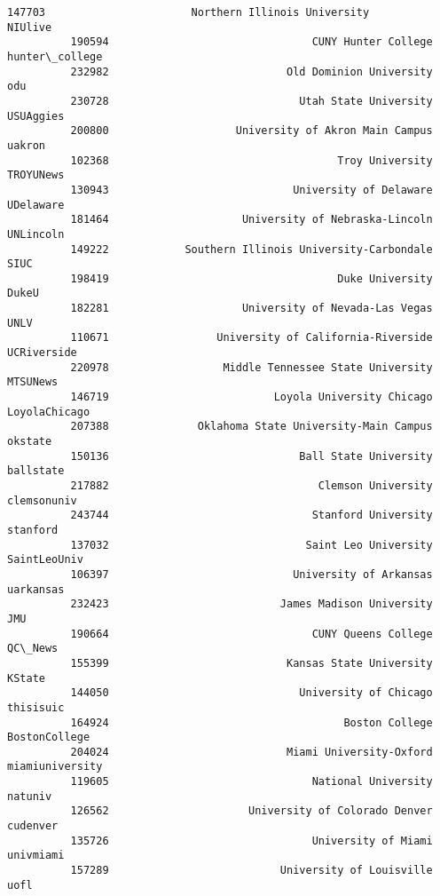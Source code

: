\documentclass[11pt]{article}
\begin{document}
\begin{Verbatim}[commandchars=\\\{\}]
          147703                       Northern Illinois University          NIUlive   
          190594                                CUNY Hunter College   hunter\_college   
          232982                            Old Dominion University              odu   
          230728                              Utah State University        USUAggies   
          200800                    University of Akron Main Campus           uakron   
          102368                                    Troy University        TROYUNews   
          130943                             University of Delaware        UDelaware   
          181464                     University of Nebraska-Lincoln        UNLincoln   
          149222            Southern Illinois University-Carbondale             SIUC   
          198419                                    Duke University            DukeU   
          182281                     University of Nevada-Las Vegas             UNLV   
          110671                 University of California-Riverside      UCRiverside   
          220978                  Middle Tennessee State University         MTSUNews   
          146719                          Loyola University Chicago    LoyolaChicago   
          207388              Oklahoma State University-Main Campus          okstate   
          150136                              Ball State University        ballstate   
          217882                                 Clemson University      clemsonuniv   
          243744                                Stanford University         stanford   
          137032                               Saint Leo University     SaintLeoUniv   
          106397                             University of Arkansas        uarkansas   
          232423                           James Madison University              JMU   
          190664                                CUNY Queens College          QC\_News   
          155399                            Kansas State University           KState   
          144050                              University of Chicago        thisisuic   
          164924                                     Boston College    BostonCollege   
          204024                            Miami University-Oxford  miamiuniversity   
          119605                                National University          natuniv   
          126562                      University of Colorado Denver         cudenver   
          135726                                University of Miami        univmiami   
          157289                           University of Louisville             uofl   

\end{Verbatim}
\end{document}
